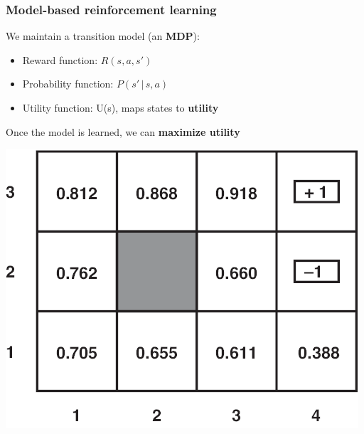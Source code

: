 \documentclass{beamer}
\begin{document}
\begin{frame}
	\frametitle{Model-based reinforcement learning}
	We maintain a transition model (an \textbf{MDP}):
	\begin{itemize}
		\item Reward function: $R(s, a, s')$
		\item Probability function: $P(s' \, | \, s, a)$
		\item Utility function: U(s), maps states to \textbf{utility}
	\end{itemize}
	Once the model is learned, we can \textbf{maximize utility}
	\begin{center}
		\includegraphics[scale=0.8]{figures/optimal-policy-values.png}
	\end{center}
\end{frame}
\end{document}
